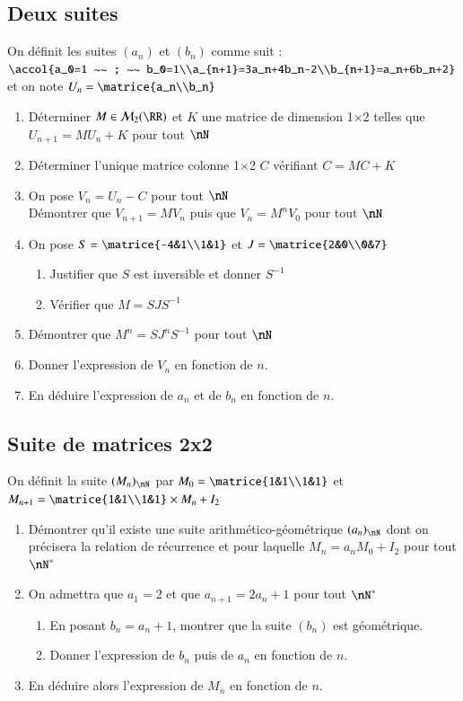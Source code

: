 \documentclass[oneside,12pt]{article}          %
\begin{document}
\subsection{Deux suites}
On définit les suites $(a_n)$ et $(b_n)$ comme suit : $\accol{a_0=1 ~~ ; ~~ b_0=1\\a_{n+1}=3a_n+4b_n-2\\b_{n+1}=a_n+6b_n+2}$ et on note $U_n=\matrice{a_n\\b_n}$

\begin{enumerate}
	\item Déterminer $M\in\mathcal{M}_2(\RR)$ et $K$ une matrice de dimension 1$\times$2 telles que $U_{n+1}=MU_n+K$ pour tout $\nN$
	\item Déterminer l'unique matrice colonne 1$\times$2 $C$ vérifiant $C=MC+K$
	\item On pose $V_n=U_n-C$ pour tout $\nN$\\
	Démontrer que $V_{n+1}=MV_n$ puis que $V_n=M^nV_0$ pour tout $\nN$
	\item On pose $S=\matrice{-4&1\\1&1}$ et $J=\matrice{2&0\\0&7}$
	\begin{enumerate}
		\item Justifier que $S$ est inversible et donner $S^{-1}$
		\item Vérifier que $M=SJS^{-1}$
	\end{enumerate}
	\item Démontrer que $M^n=SJ^nS^{-1}$ pour tout $\nN$
	\item Donner l'expression de $V_n$ en fonction de $n$.
	\item En déduire l'expression de $a_n$ et de $b_n$ en fonction de $n$.
\end{enumerate}



\subsection{Suite de matrices 2x2}
On définit la suite $(M_n)_\nN$ par $M_0=\matrice{1&1\\1&1}$ et $M_{n+1}=\matrice{1&1\\1&1}\times M_n +I_2$

\begin{enumerate}
	\item Démontrer qu'il existe une suite arithmético-géométrique $(a_n)_\nN$ dont on précisera la relation de récurrence et pour laquelle $M_n=a_nM_0+I_2$ pour tout $\nN^*$
	\item On admettra que $a_1=2$ et que $a_{n+1}=2a_n+1$ pour tout $\nN^*$
	\begin{enumerate}
		\item En posant $b_n=a_n+1$, montrer que la suite $(b_n)$ est géométrique.
		\item Donner l'expression de $b_n$ puis de $a_n$ en fonction de $n$.
	\end{enumerate}
	\item En déduire alors l'expression de $M_n$ en fonction de $n$.
\end{enumerate}
\end{document}
